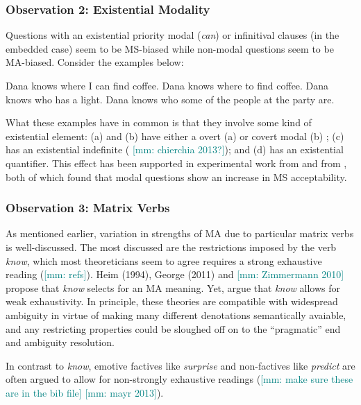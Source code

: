 \documentclass[12pt,letterpaper,table,svgnames,dvipsnames]{article}
\newcommand{\mm}[1]{\textcolor{teal}{[mm: #1]}}
\begin{document}
\subsubsection{Observation 2: Existential Modality}
Questions with an existential priority modal (\emph{can}) or infinitival clauses (in the embedded case) seem to be MS-biased while non-modal questions seem to be MA-biased. Consider the examples below:
\begin{exe}
\ex {}
    \begin{xlist}
        \ex Dana knows where I can find coffee.
        \ex Dana knows where to find coffee.
        \ex Dana knows who has a light.
        \ex Dana knows who some of the people at the party are.
    \end{xlist}
\end{exe}
What these examples have in common is that they involve some kind of existential element: (a) and (b) have either a overt (a) or covert modal (b) \cite{bhatt1999,dayal2016,xiang2016,george2011,nicolae2014,fox2014}; (c) has an existential indefinite (\cite{vanrooij2003,vanrooij2004} \mm{chierchia 2013?}); and (d) has an existential quantifier. This effect has been supported in experimental work from  and from , both of which found that modal questions show an increase in MS acceptability. 

\subsubsection{Observation 3: Matrix Verbs}
As mentioned earlier, variation in strengths of MA due to particular matrix verbs is well-discussed. The most discussed are the restrictions imposed by the verb \emph{know}, which most theoreticians seem to agree requires a strong exhaustive reading (\mm{refs}). Heim (1994), George (2011) and \mm{Zimmermann 2010} propose that \emph{know} selects for an MA meaning. Yet,  argue that \emph{know} allows for weak exhaustivity. In principle, these theories are compatible with widespread ambiguity in virtue of making many different denotations semantically avaiable, and any restricting properties could be sloughed off on to the ``pragmatic'' end and ambiguity resolution. 

In contrast to \emph{know}, emotive factives like  \emph{surprise} and non-factives like \emph{predict} are often argued to allow for non-strongly exhaustive readings (\mm{make sure these are in the bib file} \cite{beckrull1999,berman1991,heim1994,sharvit2002,lahiri2002,uegaki2015,klineroth2011,guerzshar2007,nicolae2014}\mm{mayr 2013}).
\end{document}
